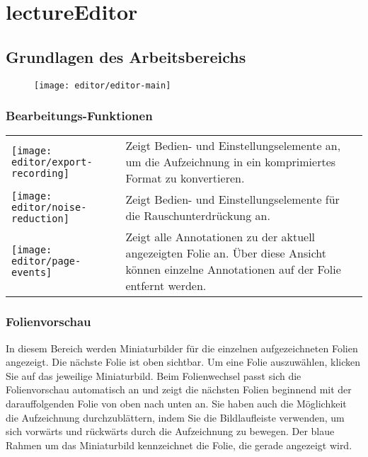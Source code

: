 \chapter{lectureEditor}

\section{Grundlagen des Arbeitsbereichs}

\begin{figure}[H]
	\centering
	\texttt{[image: editor/editor-main]}
	\caption{\lectEditor}
	\label{fig:\lectEditor}
\end{figure}

\subsection{Bearbeitungs-Funktionen}
\begin{longtable}{p{1cm}p{12cm}}
	\begin{minipage}{.035\textwidth}
		\texttt{[image: editor/export-recording]}
	\end{minipage}
	& Zeigt Bedien- und Einstellungselemente an, um die Aufzeichnung in ein komprimiertes Format zu konvertieren. \\

	\begin{minipage}{.035\textwidth}
		\texttt{[image: editor/noise-reduction]}
	\end{minipage}
	& Zeigt Bedien- und Einstellungselemente für die Rauschunterdrückung an. \\

	\begin{minipage}{.035\textwidth}
		\texttt{[image: editor/page-events]}
	\end{minipage}
	& Zeigt alle Annotationen zu der aktuell angezeigten Folie an. Über diese Ansicht können einzelne Annotationen auf der Folie entfernt werden. \\
\end{longtable}

\subsection{Folienvorschau}
In diesem Bereich werden Miniaturbilder für die einzelnen aufgezeichneten Folien angezeigt. Die nächste Folie ist oben sichtbar. Um eine Folie auszuwählen, klicken Sie auf das jeweilige Miniaturbild. Beim Folienwechsel passt sich die Folienvorschau automatisch an und zeigt die nächsten Folien beginnend mit der darauffolgenden Folie von oben nach unten an. Sie haben auch die Möglichkeit die Aufzeichnung durchzublättern, indem Sie die Bildlaufleiste verwenden, um sich vorwärts und rückwärts durch die Aufzeichnung zu bewegen. Der blaue Rahmen um das Miniaturbild kennzeichnet die Folie, die gerade angezeigt wird.


